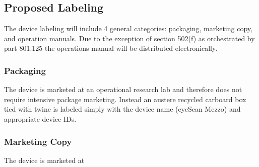 \subsection{Proposed Labeling}

The device labeling will include 4 general categories: packaging,
marketing copy, and operation manuals. Due to the exception of section
502(f) as orchestrated by part 801.125 the operations manual will be
distributed electronically.

\subsubsection{Packaging}
The device is marketed at an operational research lab and therefore
does not require intensive package marketing. Instead an austere
recycled carboard box tied with twine is labeled simply with the
device name (eyeScan Mezzo) and appropriate device IDs.

\subsubsection{Marketing Copy}
The device is marketed at 

